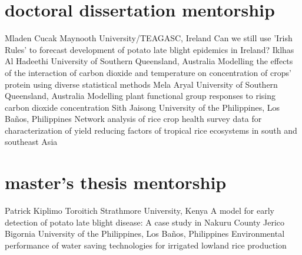 \section*{doctoral dissertation mentorship}
\begin{entrylist}
    {Mladen Cucak {}}
    {Maynooth University/TEAGASC, Ireland}
    {Can we still use 'Irish Rules' to forecast development of potato late blight epidemics in Ireland?}
    {Iklhas Al Hadeethi {}}
    {University of Southern Queensland, Australia}
    {Modelling the effects of the interaction of carbon dioxide and temperature on concentration of crops' protein using diverse statistical methods}
    {Mela Aryal {}}
    {University of Southern Queensland, Australia}
    {Modelling plant functional group responses to rising carbon dioxide concentration}
    {Sith Jaisong {}}
    {University of the Philippines, Los Ba\~nos, Philippines}
    {Network analysis of rice crop health survey data for characterization of yield reducing factors of tropical rice ecosystems in south and southeast Asia}
\end{entrylist}

\section*{master's thesis mentorship}
\begin{entrylist}
    {Patrick Kiplimo Toroitich {}}
    {Strathmore University, Kenya}
    {A model for early detection of potato late blight disease: A case study in Nakuru County}
    {Jerico Bigornia {}}
    {University of the Philippines, Los Ba\~nos, Philippines}
    {Environmental performance of water saving technologies for irrigated lowland rice production}
\end{entrylist}
